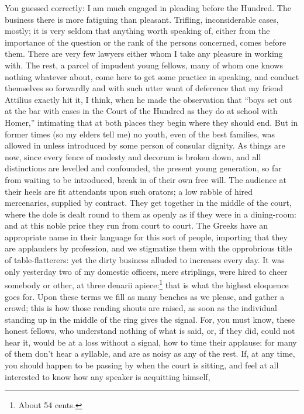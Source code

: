 You guessed correctly: I am much engaged in pleading before the Hundred.
The business there is more fatiguing than pleasant. Trifling,
inconsiderable cases, mostly; it is very seldom that anything worth
speaking of, either from the importance of the question or the rank of the
persons concerned, comes before them. There are very few lawyers either
whom I take any pleasure in working with. The rest, a parcel of impudent
young fellows, many of whom one knows nothing whatever about, come here to
get some practice in speaking, and conduct themselves so forwardly and
with such utter want of deference that my friend Attilius exactly hit it,
I think, when he made the observation that ``boys set out at the bar with
cases in the Court of the Hundred as they do at school with Homer,''
intimating that at both places they begin where they should end. But in
former times (so my elders tell me) no youth, even of the best families,
was allowed in unless introduced by some person of consular dignity. As
things are now, since every fence of modesty and decorum is broken down,
and all distinctions are levelled and confounded, the present young
generation, so far from waiting to be introduced, break in of their own
free will. The audience at their heels are fit attendants upon such
orators; a low rabble of hired mercenaries, supplied by contract. They get
together in the middle of the court, where the dole is dealt round to them
as openly as if they were in a dining-room: and at this noble price they
run from court to court. The Greeks have an appropriate name in their
language for this sort of people, importing that they are applauders by
profession, and we stigmatize them with the opprobrious title of
table-flatterers: yet the dirty business alluded to increases every day.
It was only yesterday two of my domestic officers, mere striplings, were
hired to cheer somebody or other, at three denarii apiece:\footnote{About 54 cents.}
that is what the highest eloquence goes for. Upon these terms we fill as
many benches as we please, and gather a crowd; this is how those rending
shouts are raised, as soon as the individual standing up in the middle of
the ring gives the signal. For, you must know, these honest fellows, who
understand nothing of what is said, or, if they did, could not hear it,
would be at a loss without a signal, how to time their applause: for many
of them don't hear a syllable, and are as noisy as any of the rest. If, at
any time, you should happen to be passing by when the court is sitting,
and feel at all interested to know how any speaker is acquitting himself,
